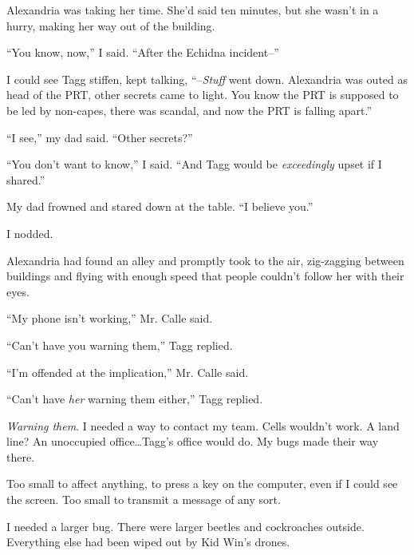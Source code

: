 Alexandria was taking her time.  She'd said ten minutes, but she wasn't in a hurry, making her way out of the building.



``You know, now,'' I said.  ``After the Echidna incident--''



I could see Tagg stiffen, kept talking, ``--\emph{Stuff} went down.  Alexandria was outed as head of the PRT, other secrets came to light.  You know the PRT is supposed to be led by non-capes, there was scandal, and now the PRT is falling apart.''



``I see,'' my dad said.  ``Other secrets?''



``You don't want to know,'' I said.  ``And Tagg would be \emph{exceedingly }upset if I shared.''



My dad frowned and stared down at the table.  ``I believe you.''



I nodded.



Alexandria had found an alley and promptly took to the air, zig-zagging between buildings and flying with enough speed that people couldn't follow her with their eyes.



``My phone isn't working,'' Mr. Calle said.



``Can't have you warning them,'' Tagg replied.



``I'm offended at the implication,'' Mr. Calle said.



``Can't have \emph{her} warning them either,'' Tagg replied.



\emph{Warning them}.  I needed a way to contact my team. Cells wouldn't work.  A land line?  An unoccupied office\ldots Tagg's office would do.  My bugs made their way there.



Too small to affect anything, to press a key on the computer, even if I could see the screen.  Too small to transmit a message of any sort.



I needed a larger bug.  There were larger beetles and cockroaches outside.  Everything else had been wiped out by Kid Win's drones.



